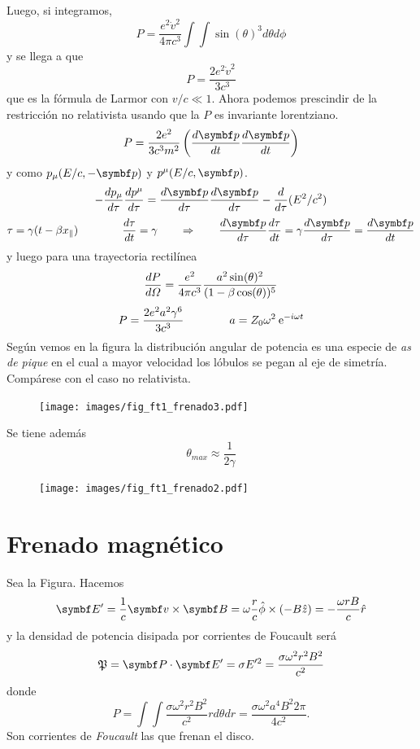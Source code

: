 \documentclass[10pt,oneside]{CBFT_book}
\begin{document}
Luego, si integramos,
\[
	P = \frac{e^2 \dot{v}^2 }{4\pi c^3} \int\int \sin(\theta)^3 d\theta d\phi
\]
y se llega a que 
\[
	P = \frac{2 e^2 \dot{v}^2 }{3 c^3}
\]
que es la fórmula de Larmor con $v/c \ll 1$. Ahora podemos prescindir de la restricción no relativista
usando que la $P$ es invariante lorentziano.
\[
	P = \frac{2 e^2}{3 c^3 m^2} \left( \dtot{\vb{p}}{t} \dtot{\vb{p}}{t} \right)
\]
y como $p_{\mu}( E/c , -\vb{p} )$ y $p^{\mu}( E/c , \vb{p} )$. 
\[
	-\dtot{p_\mu}{\tau} \dtot{p^\mu}{\tau} = \dtot{\vb{p}}{\tau} \dtot{\vb{p}}{\tau} - 
		\dtot{}{\tau}(E^2/c^2)
\]
\[
	\tau = \gamma (t-\beta x_\parallel) \qquad \qquad \dtot{\tau}{t} = \gamma \qquad \Rightarrow \qquad 
	\dtot{\vb{p}}{\tau} \dtot{\tau}{t}= \gamma \dtot{\vb{p}}{\tau} =  \dtot{\vb{p}}{t}
\]
y luego para una trayectoria rectilínea
\[
	\frac{d^{\hspace{-0.05em}} {P}}{d {\Omega}^{\hspace{-0.05em}}} = \frac{e^2}{4\pi c^3} \frac{ a^2 \sin(\theta)^2}{(1-\beta \cos(\theta))^5} 
\]
\[
	P = \frac{2 e^2 a^2 \gamma^6}{3 c^3} \qquad \qquad a = Z_0 \omega^2 \:\mathrm{e}^{-i \omega t}
\]
Según vemos en la figura la distribución angular de potencia es una especie de {\it as de pique} en el cual
a mayor velocidad los lóbulos se pegan al eje de simetría. Compárese con el caso no relativista.
\begin{figure}[htb]
	\begin{center}
	\texttt{[image: images/fig\_ft1\_frenado3.pdf]}	 
	\end{center}
	\caption{}
\end{figure} 

Se tiene además 
\[
	\theta_{max} \approx \frac{1}{2\gamma}
\]

\begin{figure}[htb]
	\begin{center}
	\texttt{[image: images/fig\_ft1\_frenado2.pdf]}	 
	\end{center}
	\caption{}
\end{figure} 

\section{Frenado magnético}

Sea la Figura. Hacemos
\[
	\vb{E}' = \frac{1}{c}\pv{v}{B} = \omega \frac{r}{c} \hat{\phi} \times (-B\hat{z}) = 
	-\frac{\omega r B}{c} \hat{r}
\]
y la densidad de potencia disipada por corrientes de Foucault será
\[
	\mathfrak{P} = \pe{P}{E'} = \sigma E'^2 = \frac{\sigma \omega^2 r^2 B^2}{c^2}
\]
donde 
\[
	P = \int \int \frac{\sigma \omega^2 r^2 B^2}{c^2} r d\theta dr =
		\frac{\sigma \omega^2 a^4 B^2 2\pi }{4 c^2}.
\]
Son corrientes de {\it Foucault} las que frenan el disco.
\end{document}
